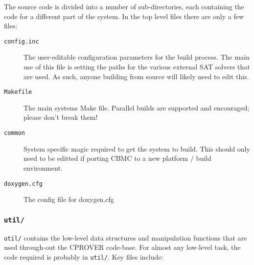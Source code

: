 \documentclass{article}
\newcommand{\dir}[1]{\texttt{#1}}
\newcommand{\file}[1]{\texttt{#1}}
\begin{document}
The source code is divided into a number of sub-directories, each
containing the code for a different part of the system.  In the top
level files there are only a few files:

\begin{description}
  \item[\file{config.inc}]{The user-editable configuration parameters
    for the build process.  The main use of this file is setting the
    paths for the various external SAT solvers that are used.  As
    such, anyone building from source will likely need to edit this.}
  \item[\file{Makefile}]{The main systems Make file.  Parallel builds
    are supported and encouraged; please don't break them!}
  \item[\file{common}]{System specific magic required to get the
    system to build.  This should only need to be editted if porting
    CBMC to a new platform / build environment.}
  \item[\file{doxygen.cfg}]{The config file for doxygen.cfg}
\end{description}



\subsubsection{\dir{util/}}
\label{section:util}

\dir{util/} contains the low-level data structures and manipulation
functions that are used through-out the CPROVER code-base.  For almost
any low-level task, the code required is probably in \dir{util/}.  Key
files include:
\end{document}
